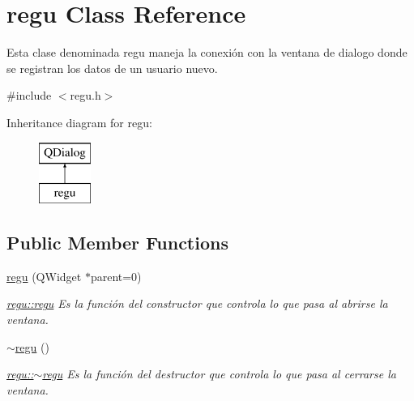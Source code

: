 \hypertarget{classregu}{}\section{regu Class Reference}
\label{classregu}


Esta clase denominada regu maneja la conexión con la ventana de dialogo donde se registran los datos de un usuario nuevo.  




{\ttfamily \#include $<$regu.\+h$>$}

Inheritance diagram for regu\+:\begin{figure}[H]
\begin{center}
\leavevmode
\includegraphics[height=2.000000cm]{classregu}
\end{center}
\end{figure}
\subsection*{Public Member Functions}
\begin{DoxyCompactItemize}
\item 
\hyperlink{classregu_a4233920e912063eba919a7031cadc10a}{regu} (Q\+Widget $\ast$parent=0)
\begin{DoxyCompactList}\small\item\em \hyperlink{classregu_a4233920e912063eba919a7031cadc10a}{regu\+::regu} Es la función del constructor que controla lo que pasa al abrirse la ventana. \end{DoxyCompactList}\item 
\hyperlink{classregu_af4ce8301d06b2636e666ac5c9cf46e36}{$\sim$regu} ()
\begin{DoxyCompactList}\small\item\em \hyperlink{classregu_af4ce8301d06b2636e666ac5c9cf46e36}{regu\+::$\sim$regu} Es la función del destructor que controla lo que pasa al cerrarse la ventana. \end{DoxyCompactList}\end{DoxyCompactItemize}
